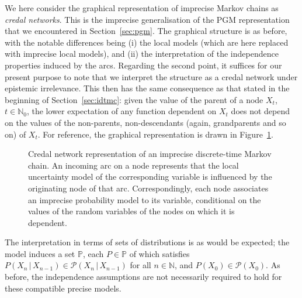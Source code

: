 \documentclass[graybox]{svmult}
\newcommand{\nats}{\mathbb{N}}
\newcommand{\natswith}{\nats_{0}}
\begin{document}
We here consider the graphical representation of imprecise Markov chains as \emph{credal networks}. This is the imprecise generalisation of the PGM representation that we encountered in Section~\ref{sec:pgm}. The graphical structure is as before, with the notable differences being (i) the local models (which are here replaced with imprecise local models), and (ii) the interpretation of the independence properties induced by the arcs. Regarding the second point, it suffices for our present purpose to note that we interpret the structure as a credal network under epistemic irrelevance. This then has the same consequence as that stated in the beginning of Section~\ref{sec:idtmc}: given the value of the parent of a node $X_t$, $t\in\natswith$, the lower expectation of any function dependent on $X_t$ does not depend on the values of the non-parents, non-descendants (again, grandparents and so on) of $X_t$. For reference, the graphical representation is drawn in Figure~\ref{fig:example_markov_credal}.

\begin{figure}
\centering
{}
\caption{Credal network representation of an imprecise discrete-time Markov chain. An incoming arc on a node represents that the local uncertainty model of the corresponding variable is influenced by the originating node of that arc. Correspondingly, each node associates an imprecise probability model to its variable, conditional on the values of the random variables of the nodes on which it is dependent.}
\label{fig:example_markov_credal}
\end{figure}
The interpretation in terms of sets of distributions is as would be expected; the model induces a set $\mathbb{P}$, each $P\in\mathbb{P}$ of which satisfies $P(X_n\,\vert\,X_{n-1})\in\mathcal{P}(X_n\,\vert\,X_{n-1})$ for all $n\in\nats$, and $P(X_0)\in\mathcal{P}(X_0)$. As before, the independence assumptions are not necessarily required to hold for these compatible precise models.
\end{document}
